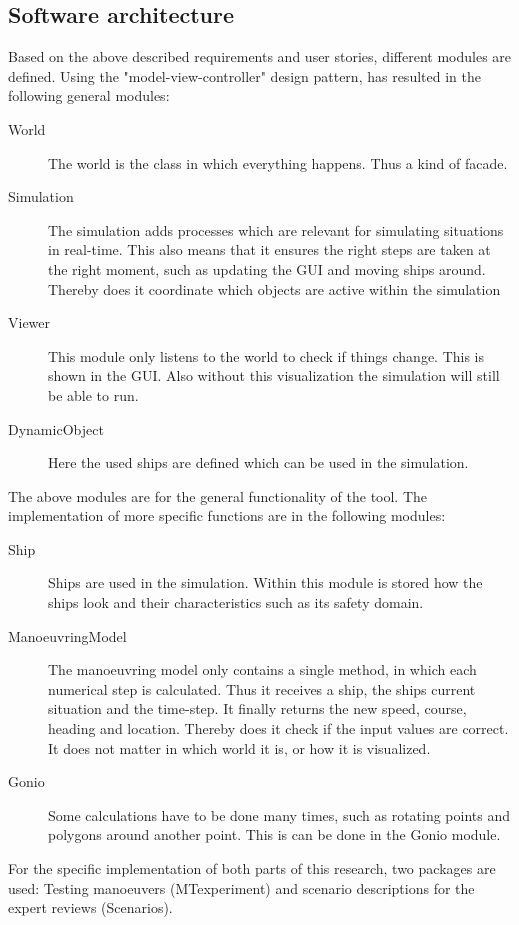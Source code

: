 \subsection{Software architecture}
Based on the above described requirements and user stories, different modules are defined. Using the "model-view-controller" design pattern, has resulted in the following general modules:
\begin{description}
	\item[World] The world is the class in which everything happens. Thus a kind of facade.
	\item[Simulation] The simulation adds processes which are relevant for simulating situations in real-time. This also means that it ensures the right steps are taken at the right moment, such as updating the GUI and moving ships around. Thereby does it coordinate which objects are active within the simulation
	\item[Viewer] This module only listens to the world to check if things change. This is shown in the GUI. Also without this visualization the simulation will still be able to run.
	\item[DynamicObject] Here the used ships are defined which can be used in the simulation.
\end{description}

The above modules are for the general functionality of the tool. The implementation of more specific functions are in the following modules:
\begin{description}
	\item[Ship] Ships are used in the simulation. Within this module is stored how the ships look and their characteristics such as its safety domain.
	\item[ManoeuvringModel] The manoeuvring model only contains a single method, in which each numerical step is calculated. Thus it receives a ship, the ships current situation and the time-step. It finally returns the new speed, course, heading and location. Thereby does it check if the input values are correct. It does not matter in which world it is, or how it is visualized.
	\item[Gonio] Some calculations have to be done many times, such as rotating points and polygons around another point. This is can be done in the Gonio module.
\end{description}


For the specific implementation of both parts of this research, two packages are used: Testing manoeuvers (MTexperiment) and scenario descriptions for the expert reviews (Scenarios). 

